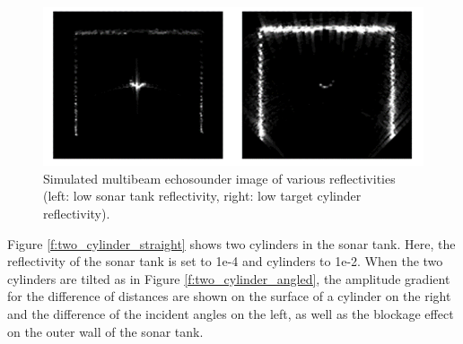 \documentclass[utf8]{frontiersSCNS} %
\begin{document}
\begin{figure}[ht]
  \centering
  \includegraphics[width=\columnwidth]{images/single_cylinder_reflectivity.png}
  \caption{Simulated multibeam echosounder image of various reflectivities (left: low sonar tank reflectivity, right: low target cylinder reflectivity).}
  \label{f:single_cylinder_reflectivity}
\end{figure}

Figure \ref{f:two_cylinder_straight} shows two cylinders in the sonar tank. Here, the reflectivity of the sonar tank is set to 1e-4 and cylinders to 1e-2. When the two cylinders are tilted as in Figure \ref{f:two_cylinder_angled}, the amplitude gradient for the difference of distances are shown on the surface of a cylinder on the right and the difference of the incident angles on the left, as well as the blockage effect on the outer wall of the sonar tank.
\end{document}
